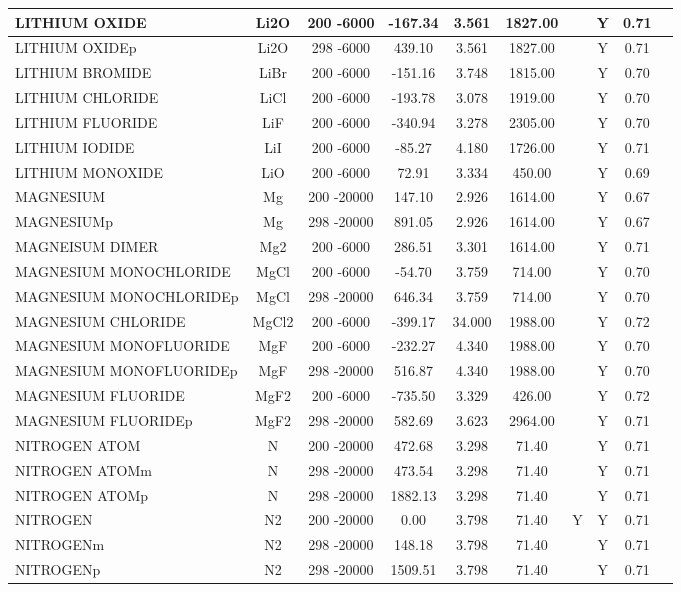 \begin{longtable}{@{\extracolsep{\fill}}|l|c|c|c|c|c|c|c|c|l|}
LITHIUM OXIDE&Li2O&200 -6000& -167.34& 3.561&  1827.00& &Y& 0.71&\\ \hline
LITHIUM OXIDEp&Li2O&298 -6000&  439.10& 3.561&  1827.00& &Y& 0.71&\\ \hline
LITHIUM BROMIDE&LiBr&200 -6000& -151.16& 3.748&  1815.00& &Y& 0.70&\\ \hline
LITHIUM CHLORIDE&LiCl&200 -6000& -193.78& 3.078&  1919.00& &Y& 0.70&\\ \hline
LITHIUM FLUORIDE&LiF&200 -6000& -340.94& 3.278&  2305.00& &Y& 0.70&\\ \hline
LITHIUM IODIDE&LiI&200 -6000&  -85.27& 4.180&  1726.00& &Y& 0.71&\\ \hline
LITHIUM MONOXIDE&LiO&200 -6000&   72.91& 3.334&   450.00& &Y& 0.69&\\ \hline
MAGNESIUM&Mg&200 -20000&  147.10& 2.926&  1614.00& &Y& 0.67&\\ \hline
MAGNESIUMp&Mg&298 -20000&  891.05& 2.926&  1614.00& &Y& 0.67&\\ \hline
MAGNEISUM DIMER&Mg2&200 -6000&  286.51& 3.301&  1614.00& &Y& 0.71&\\ \hline
MAGNESIUM MONOCHLORIDE&MgCl&200 -6000&  -54.70& 3.759&   714.00& &Y& 0.70&\\ \hline
MAGNESIUM MONOCHLORIDEp&MgCl&298 -20000&  646.34& 3.759&   714.00& &Y& 0.70&\\ \hline
MAGNESIUM CHLORIDE&MgCl2&200 -6000& -399.17&34.000&  1988.00& &Y& 0.72&\\ \hline
MAGNESIUM MONOFLUORIDE&MgF&200 -6000& -232.27& 4.340&  1988.00& &Y& 0.70&\\ \hline
MAGNESIUM MONOFLUORIDEp&MgF&298 -20000&  516.87& 4.340&  1988.00& &Y& 0.70&\\ \hline
MAGNESIUM FLUORIDE&MgF2&200 -6000& -735.50& 3.329&   426.00& &Y& 0.72&\\ \hline
MAGNESIUM FLUORIDEp&MgF2&298 -20000&  582.69& 3.623&  2964.00& &Y& 0.71&\\ \hline
NITROGEN ATOM&N&200 -20000&  472.68& 3.298&    71.40& &Y& 0.71&\\ \hline
NITROGEN ATOMm&N&298 -20000&  473.54& 3.298&    71.40& &Y& 0.71&\\ \hline
NITROGEN ATOMp&N&298 -20000& 1882.13& 3.298&    71.40& &Y& 0.71&\\ \hline
NITROGEN&N2&200 -20000&    0.00& 3.798&    71.40&Y&Y& 0.71&\\ \hline
NITROGENm&N2&298 -20000&  148.18& 3.798&    71.40& &Y& 0.71&\\ \hline
NITROGENp&N2&298 -20000& 1509.51& 3.798&    71.40& &Y& 0.71&\\ \hline

\end{longtable}
